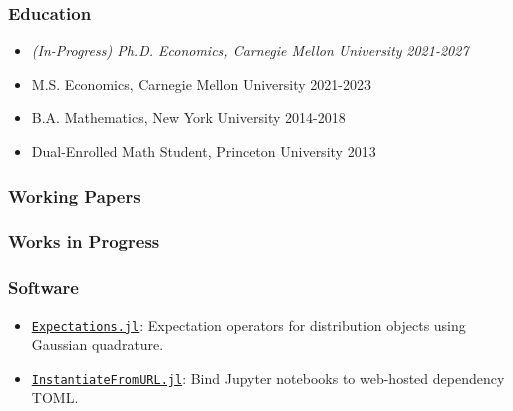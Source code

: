 \documentclass[12pt]{article}   %
\begin{document}
\subsubsection*{Education}
\begin{itemize}
  \item \textit{(In-Progress) Ph.D. Economics, Carnegie Mellon University} \hfill \emph{2021-2027}
  \item M.S. Economics, Carnegie Mellon University \hfill 2021-2023
  \item B.A. Mathematics, New York University \hfill 2014-2018
  \item Dual-Enrolled Math Student, Princeton University \hfill 2013
\end{itemize} 


\subsubsection*{Working Papers}
\begin{refsection} %
\nocite{NBERw28981}
\hspace*{1.2cm}%
\begin{minipage}{0.9\textwidth}%
  \printbibliography[heading=none, sorting=ynt]
\end{minipage}%
\end{refsection}

\subsubsection*{Works in Progress}
\begin{refsection} %
\nocite{FP}
\hspace*{1.2cm}%
\begin{minipage}{0.9\textwidth}%
  \printbibliography[heading=none, sorting=ynt]
\end{minipage}%
\end{refsection}


\subsubsection*{Software}
\begin{itemize}
  \item \href{https://github.com/QuantEcon/Expectations.jl}{\texttt{Expectations.jl}}: Expectation operators for distribution objects using Gaussian quadrature.
  \item \href{https://github.com/QuantEcon/InstantiateFromURL.jl}{\texttt{InstantiateFromURL.jl}}: Bind Jupyter notebooks to web-hosted dependency TOML.
\end{itemize}
\end{document}
